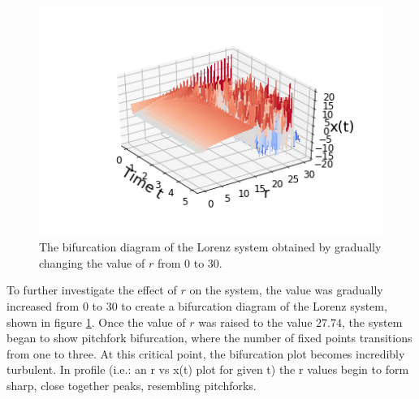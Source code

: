 \documentclass[twocolumn]{article}
\begin{document}
\begin{figure}
	\includegraphics[width=\linewidth]{bifurcation.png}
	\caption{
		The bifurcation diagram of the Lorenz system obtained by gradually changing
		the value of $r$ from $0$ to $30$.
	}
	\label{fig:bifurcation}
\end{figure}

To further investigate the effect of $r$ on the system, the value was gradually
increased from $0$ to $30$ to create a bifurcation diagram of the Lorenz system,
shown in figure \ref{fig:bifurcation}. Once the value of $r$ was raised to the
value $27.74$, the system began to show pitchfork bifurcation, where the number
of fixed points transitions from one to three. At this critical point, the bifurcation plot becomes incredibly turbulent. In profile (i.e.: an r vs x(t) plot for given t) the r values begin to form sharp, close together peaks, resembling pitchforks.
\end{document}

